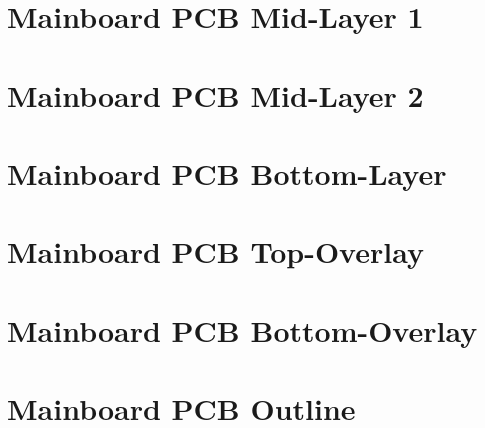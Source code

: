 \section{Mainboard PCB Mid-Layer 1}
\enlargethispage{2.5cm}
\begin{adjustwidth}{-0.23cm}{0cm} \hfuzz=7.0pt \vfuzz=19.0pt
\end{adjustwidth}
\newpage

\section{Mainboard PCB Mid-Layer 2}
\enlargethispage{2.5cm}
\begin{adjustwidth}{0.23cm}{0cm} \hfuzz=7.0pt \vfuzz=19.0pt
\end{adjustwidth}
\newpage

\section{Mainboard PCB Bottom-Layer}
\enlargethispage{2.5cm}
\begin{adjustwidth}{-0.23cm}{0cm} \hfuzz=7.0pt \vfuzz=19.0pt
\end{adjustwidth}
\newpage

\section{Mainboard PCB Top-Overlay}
\enlargethispage{2.5cm}
\begin{adjustwidth}{0.23cm}{0cm} \hfuzz=7.0pt \vfuzz=19.0pt
\end{adjustwidth}
\newpage

\section{Mainboard PCB Bottom-Overlay}
\enlargethispage{2.5cm}
\begin{adjustwidth}{-0.23cm}{0cm} \hfuzz=7.0pt \vfuzz=19.0pt
\end{adjustwidth}
\newpage

\section{Mainboard PCB Outline}
\enlargethispage{2.5cm}
\begin{adjustwidth}{0.23cm}{0cm} \hfuzz=7.0pt \vfuzz=19.0pt
\end{adjustwidth}
\newpage

